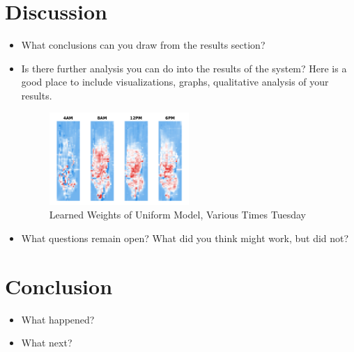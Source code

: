\documentclass{article}
\begin{document}



\section{Discussion}



\begin{itemize}
\item What conclusions can you draw from the results section?
\item Is there further analysis you can do into the results of the system? Here is a good place to include visualizations, graphs, qualitative analysis of your results.

\begin{figure}[h]
\centering
\includegraphics[width=0.5\textwidth]{figs/unifmaps.pdf}
\caption{Learned Weights of Uniform Model, Various Times Tuesday}
\label{fig:unifmap}
\end{figure}


\item  What questions remain open? What did you think might work, but did not?
\end{itemize}




\section{Conclusion}

\begin{itemize}
\item What happened?
\item What next?
\end{itemize}
\end{document}
